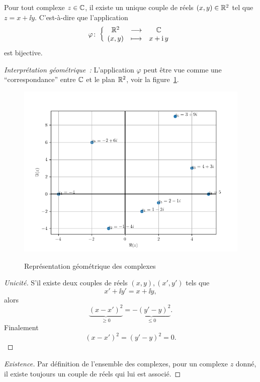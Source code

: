 %
\begin{prop}
  Pour tout complexe \(z \in \mathbb{C}\), il existe un unique couple de réels \((x,y) \in \mathbb{R}^2\) tel que \(z=x+\ii y\). C'est-à-dire que l'application
  \begin{equation}
    \varphi\colon \left\{\begin{array}{ccc} \mathbb{R}^2 & \longrightarrow &\mathbb{C}\\ (x,y) & \longmapsto & x+\operatorname{i} y \end{array} \right.
  \end{equation}
  est bijective.
\end{prop}
\emph{Interprétation géométrique~:} L'application $\varphi$ peut être vue comme une ``correspondance'' entre $\mathbb{C}$ et le plan $\mathbb{R}^2$, voir la figure~\ref{fig:complexe}.
\begin{figure}
    \centering
    \includegraphics[scale=0.7]{./Complexes.png}
    \label{fig:complexe}
    \caption{Représentation géométrique des complexes}
\end{figure}
\begin{proof}[Unicité]
  S'il existe deux couples de réels \((x,y),(x',y')\) tels que
  \begin{equation}
    x'+\ii y'=x +\ii y,
  \end{equation}
  alors
  \begin{equation}
    \underbrace{(x-x')^2}_{\geqslant 0}=\underbrace{-(y'-y)^2}_{\leqslant 0}.
  \end{equation}
  Finalement
  \begin{equation}
    (x-x')^2=(y'-y)^2=0.
  \end{equation}
\end{proof}
\begin{proof}[Existence]
  Par définition de l'ensemble des complexes, pour un complexe \(z\) donné, il existe toujours un couple de réels qui lui est associé.
\end{proof}
